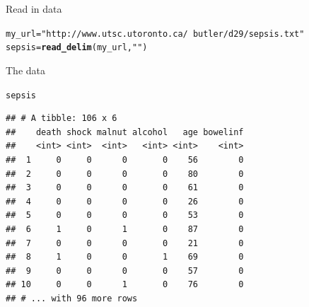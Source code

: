 \documentclass[unknownkeysallowed]{beamer}\usepackage[]{graphicx}\usepackage[]{color}
\makeatletter
\newcommand{\hlstr}[1]{\textcolor[rgb]{0.192,0.494,0.8}{#1}}%
\newcommand{\hlstd}[1]{\textcolor[rgb]{0.345,0.345,0.345}{#1}}%
\newcommand{\hlkwb}[1]{\textcolor[rgb]{0.69,0.353,0.396}{#1}}%
\newcommand{\hlkwd}[1]{\textcolor[rgb]{0.737,0.353,0.396}{\textbf{#1}}}%
\newenvironment{kframe}{%
 \def\at@end@of@kframe{}%
 \ifinner\ifhmode%
  \def\at@end@of@kframe{\end{minipage}}%
  \begin{minipage}{\columnwidth}%
 \fi\fi%
 \def\FrameCommand##1{\hskip\@totalleftmargin \hskip-\fboxsep
 \colorbox{shadecolor}{##1}\hskip-\fboxsep
     \hskip-\linewidth \hskip-\@totalleftmargin \hskip\columnwidth}%
 \MakeFramed {\advance\hsize-\width
   \@totalleftmargin\z@ \linewidth\hsize
   \@setminipage}}%
 {\par\unskip\endMakeFramed%
 \at@end@of@kframe}
\newenvironment{knitrout}{}{} %
\makeatother
\begin{document}
\begin{frame}[fragile]{Read in data}

 
\begin{knitrout}\footnotesize
{}\color{fgcolor}\begin{kframe}
\begin{alltt}
\hlstd{my_url}\hlkwb{=}\hlstr{"http://www.utsc.utoronto.ca/~butler/d29/sepsis.txt"}
\hlstd{sepsis}\hlkwb{=}\hlkwd{read_delim}\hlstd{(my_url,}\hlstr{" "}\hlstd{)}
\end{alltt}


{\ttfamily\noindent\itshape\color{messagecolor}{\#\# Parsed with column specification:\\\#\# cols(\\\#\#\ \  death = col\_integer(),\\\#\#\ \  shock = col\_integer(),\\\#\#\ \  malnut = col\_integer(),\\\#\#\ \  alcohol = col\_integer(),\\\#\#\ \  age = col\_integer(),\\\#\#\ \  bowelinf = col\_integer()\\\#\# )}}\end{kframe}
\end{knitrout}
  

\end{frame}

\begin{frame}[fragile]{The data}
  
\begin{knitrout}\footnotesize
{}\color{fgcolor}\begin{kframe}
\begin{alltt}
\hlstd{sepsis}
\end{alltt}
\begin{verbatim}
## # A tibble: 106 x 6
##    death shock malnut alcohol   age bowelinf
##    <int> <int>  <int>   <int> <int>    <int>
##  1     0     0      0       0    56        0
##  2     0     0      0       0    80        0
##  3     0     0      0       0    61        0
##  4     0     0      0       0    26        0
##  5     0     0      0       0    53        0
##  6     1     0      1       0    87        0
##  7     0     0      0       0    21        0
##  8     1     0      0       1    69        0
##  9     0     0      0       0    57        0
## 10     0     0      1       0    76        0
## # ... with 96 more rows
\end{verbatim}
\end{kframe}
\end{knitrout}
  
\end{frame}
\end{document}
